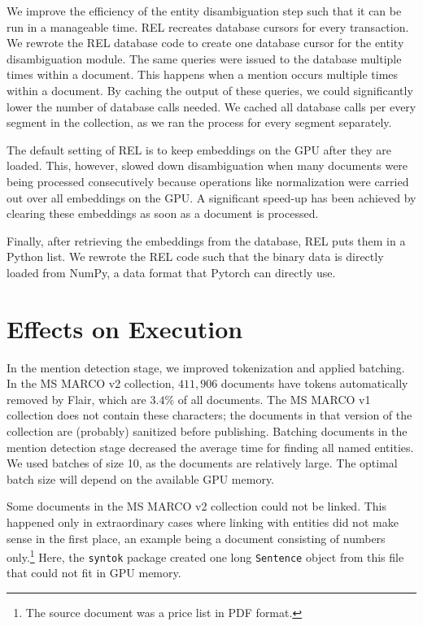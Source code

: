 We improve the efficiency of the entity disambiguation step such that it can be run in a manageable time. REL recreates database cursors for every transaction. We rewrote the REL database code to create one database cursor for the entity disambiguation module. 
The same queries were issued to the database multiple times within a document. This happens when a mention occurs multiple times within a document. By caching the output of these queries, we could significantly lower the number of database calls needed. We cached all database calls per every segment in the collection, as we ran the process for every segment separately. 

The default setting of REL is to keep embeddings on the GPU after they are loaded. This, however, slowed down disambiguation when many documents were being processed consecutively because operations like normalization were carried out over all embeddings on the GPU. A significant speed-up has been achieved by clearing these embeddings as soon as a document is processed.

Finally, after retrieving the embeddings from the database, REL puts them in a Python list. We rewrote the REL code such that the binary data is directly loaded from NumPy, a data format that Pytorch can directly use. 

\section{Effects on Execution}
In the mention detection stage, we improved tokenization and applied batching. In the MS MARCO v2 collection, $411,906$ documents have tokens automatically removed by Flair, which are $3.4\%$ of all documents. The MS MARCO v1 collection does not contain these characters; the documents in that version of the collection are (probably) sanitized before publishing.
Batching documents in the mention detection stage decreased the average time for finding all named entities. We used batches of size 10, as the documents are relatively large. The optimal batch size will depend on the available GPU memory.

Some documents in the MS MARCO v2 collection could not be linked. This happened only in extraordinary cases where linking with entities did not make sense in the first place, an example being a document consisting of numbers only.\footnote{The source document was a price list in PDF format.} Here, the \texttt{syntok} package created one long \texttt{Sentence} object from this file that could not fit in GPU memory.

